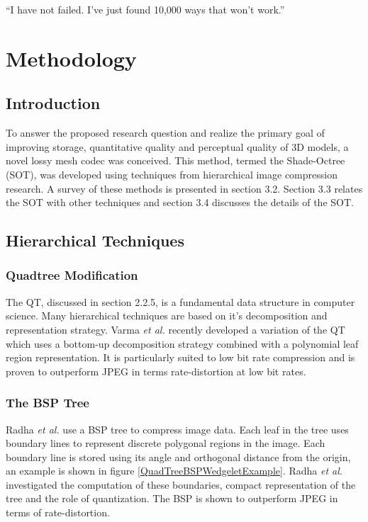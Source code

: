 \begin{savequote}[8cm]
  ``I have not failed. I've just found 10,000 ways that won't work.''
\end{savequote}
\makeatletter
\chapter{Methodology}

\section{Introduction}

To answer the proposed research question and realize the primary goal of improving storage, quantitative quality and perceptual quality of 3D models, a novel lossy mesh codec was conceived. This method, termed the Shade-Octree (SOT), was developed using techniques from hierarchical image compression research. A survey of these methods is presented in section 3.2. Section 3.3 relates the SOT with other techniques and section 3.4 discusses the details of the SOT.

\section{Hierarchical Techniques}

\subsection{Quadtree Modification}
The QT, discussed in section 2.2.5, is a fundamental data structure in computer science. Many hierarchical techniques are based on it's decomposition and representation strategy. Varma \textit{et al.} \cite{Varma12Application} recently developed a variation of the QT which uses a bottom-up decomposition strategy combined with a polynomial leaf region representation. It is particularly suited to low bit rate compression and is proven to outperform JPEG in terms rate-distortion at low bit rates.

\subsection{The BSP Tree}

Radha \textit{et al.} \cite{Radha96Image} use a BSP tree to compress image data. Each leaf in the tree uses boundary lines to represent discrete polygonal regions in the image. Each boundary line is stored using its angle and orthogonal distance from the origin, an example is shown in figure \ref{QuadTreeBSPWedgeletExample}. Radha \textit{et al.} investigated the computation of these boundaries, compact representation of the tree and the role of quantization. The BSP is shown to outperform JPEG in terms of rate-distortion.

